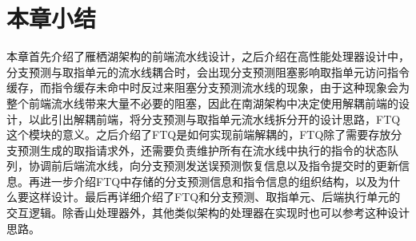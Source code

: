 
\section{本章小结}

本章首先介绍了雁栖湖架构的前端流水线设计，之后介绍在高性能处理器设计中，分支预测与取指单元的流水线耦合时，会出现分支预测阻塞影响取指单元访问指令缓存，而指令缓存未命中时反过来阻塞分支预测流水线的现象，由于这种现象会为整个前端流水线带来大量不必要的阻塞，因此在南湖架构中决定使用解耦前端的设计，以此引出解耦前端，将分支预测与取指单元流水线拆分开的设计思路，FTQ这个模块的意义。之后介绍了FTQ是如何实现前端解耦的，FTQ除了需要存放分支预测生成的取指请求外，还需要负责维护所有在流水线中执行的指令的状态队列，协调前后端流水线，向分支预测发送误预测恢复信息以及指令提交时的更新信息。再进一步介绍FTQ中存储的分支预测信息和指令信息的组织结构，以及为什么要这样设计。最后再详细介绍了FTQ和分支预测、取指单元、后端执行单元的交互逻辑。除香山处理器外，其他类似架构的处理器在实现时也可以参考这种设计思路。
